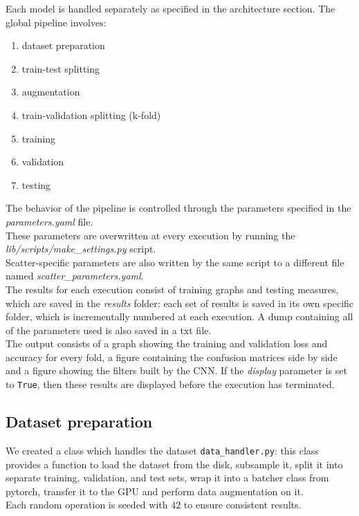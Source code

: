 \documentclass{report}
\begin{document}
Each model is handled separately as specified in the architecture section.
The global pipeline involves:
\begin{enumerate}
  \item dataset preparation
  \item train-test splitting
  \item augmentation
  \item train-validation splitting (k-fold)
  \item training
  \item validation
  \item testing
\end{enumerate}

The behavior of the pipeline is controlled through the parameters specified in the \textit{parameters.yaml} file.\\
These parameters are overwritten at every execution by running the \textit{lib/scripts/make\_settings.py} script.\\
Scatter-specific parameters are also written by the same script to a different file named \textit{scatter\_parameters.yaml}.\\

The results for each execution consist of training graphs and testing measures, which are saved in the \textit{results} folder: each set of results is saved in its own specific folder, which is incrementally numbered
at each execution. A dump containing all of the parameters used is also saved in a txt file.\\
The output consists of a graph showing the training and validation loss and accuracy for every fold,
a figure containing the confusion matrices side by side and a figure showing the filters built by the CNN.
If the \textit{display} parameter is set to \texttt{True}, then these results are displayed before the execution has terminated.\\

\subsection{Dataset preparation}
We created a class which handles the dataset \texttt{data\_handler.py}: this class provides a function to load the dataset from the disk, subsample it, split it
into separate training, validation, and test sets, wrap it into a batcher class from pytorch, transfer it to the GPU and perform data augmentation on it. \\
Each random operation is seeded with 42 to ensure consistent results.\\
\end{document}

